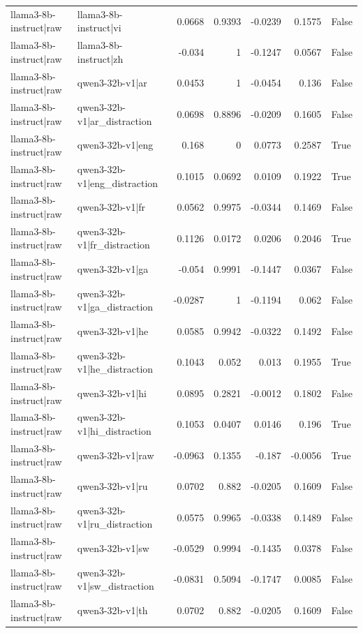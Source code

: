 \begin{table}
\begin{tabular}{l l r r r r l}
llama3-8b-instruct|raw & llama3-8b-instruct|vi & 0.0668 & 0.9393 & -0.0239 & 0.1575 & False \\
llama3-8b-instruct|raw & llama3-8b-instruct|zh & -0.034 & 1 & -0.1247 & 0.0567 & False \\
llama3-8b-instruct|raw & qwen3-32b-v1|ar & 0.0453 & 1 & -0.0454 & 0.136 & False \\
llama3-8b-instruct|raw & qwen3-32b-v1|ar_distraction & 0.0698 & 0.8896 & -0.0209 & 0.1605 & False \\
llama3-8b-instruct|raw & qwen3-32b-v1|eng & 0.168 & 0 & 0.0773 & 0.2587 & True \\
llama3-8b-instruct|raw & qwen3-32b-v1|eng_distraction & 0.1015 & 0.0692 & 0.0109 & 0.1922 & True \\
llama3-8b-instruct|raw & qwen3-32b-v1|fr & 0.0562 & 0.9975 & -0.0344 & 0.1469 & False \\
llama3-8b-instruct|raw & qwen3-32b-v1|fr_distraction & 0.1126 & 0.0172 & 0.0206 & 0.2046 & True \\
llama3-8b-instruct|raw & qwen3-32b-v1|ga & -0.054 & 0.9991 & -0.1447 & 0.0367 & False \\
llama3-8b-instruct|raw & qwen3-32b-v1|ga_distraction & -0.0287 & 1 & -0.1194 & 0.062 & False \\
llama3-8b-instruct|raw & qwen3-32b-v1|he & 0.0585 & 0.9942 & -0.0322 & 0.1492 & False \\
llama3-8b-instruct|raw & qwen3-32b-v1|he_distraction & 0.1043 & 0.052 & 0.013 & 0.1955 & True \\
llama3-8b-instruct|raw & qwen3-32b-v1|hi & 0.0895 & 0.2821 & -0.0012 & 0.1802 & False \\
llama3-8b-instruct|raw & qwen3-32b-v1|hi_distraction & 0.1053 & 0.0407 & 0.0146 & 0.196 & True \\
llama3-8b-instruct|raw & qwen3-32b-v1|raw & -0.0963 & 0.1355 & -0.187 & -0.0056 & True \\
llama3-8b-instruct|raw & qwen3-32b-v1|ru & 0.0702 & 0.882 & -0.0205 & 0.1609 & False \\
llama3-8b-instruct|raw & qwen3-32b-v1|ru_distraction & 0.0575 & 0.9965 & -0.0338 & 0.1489 & False \\
llama3-8b-instruct|raw & qwen3-32b-v1|sw & -0.0529 & 0.9994 & -0.1435 & 0.0378 & False \\
llama3-8b-instruct|raw & qwen3-32b-v1|sw_distraction & -0.0831 & 0.5094 & -0.1747 & 0.0085 & False \\
llama3-8b-instruct|raw & qwen3-32b-v1|th & 0.0702 & 0.882 & -0.0205 & 0.1609 & False \\

\end{tabular}
\end{table}

